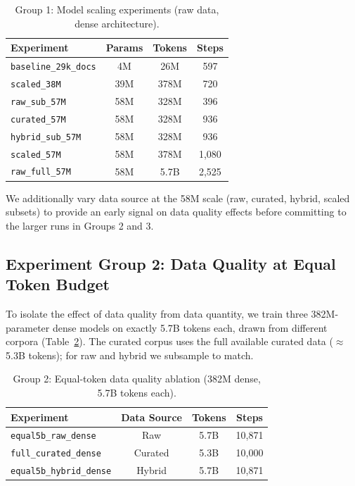 \begin{table}[h]
\centering
\caption{Group 1: Model scaling experiments (raw data, dense architecture).}
\label{tab:group1}
\begin{tabular}{lccc}
\toprule
\textbf{Experiment} & \textbf{Params} & \textbf{Tokens} & \textbf{Steps} \\
\midrule
\texttt{baseline\_29k\_docs} & 4M   & 26M   & 597    \\
\texttt{scaled\_38M}         & 39M  & 378M  & 720    \\
\texttt{raw\_sub\_57M}       & 58M  & 328M  & 396    \\
\texttt{curated\_57M}        & 58M  & 328M  & 936    \\
\texttt{hybrid\_sub\_57M}    & 58M  & 328M  & 936    \\
\texttt{scaled\_57M}         & 58M  & 378M  & 1,080  \\
\texttt{raw\_full\_57M}      & 58M  & 5.7B  & 2,525  \\
\bottomrule
\end{tabular}
\end{table}

We additionally vary data source at the 58M scale (raw, curated, hybrid,
scaled subsets) to provide an early signal on data quality effects before
committing to the larger runs in Groups 2 and 3.

\subsection{Experiment Group 2: Data Quality at Equal Token Budget}
\label{sec:group2}

To isolate the effect of data quality from data quantity, we train three
382M-parameter dense models on exactly 5.7B tokens each, drawn from
different corpora (Table~\ref{tab:group2}).  The curated corpus uses the
full available curated data ($\approx$5.3B tokens); for raw and hybrid we
subsample to match.

\begin{table}[h]
\centering
\caption{Group 2: Equal-token data quality ablation (382M dense, 5.7B tokens each).}
\label{tab:group2}
\begin{tabular}{lccc}
\toprule
\textbf{Experiment} & \textbf{Data Source} & \textbf{Tokens} & \textbf{Steps} \\
\midrule
\texttt{equal5b\_raw\_dense}    & Raw     & 5.7B & 10,871 \\
\texttt{full\_curated\_dense}   & Curated & 5.3B & 10,000 \\
\texttt{equal5b\_hybrid\_dense} & Hybrid  & 5.7B & 10,871 \\
\bottomrule
\end{tabular}
\end{table}


